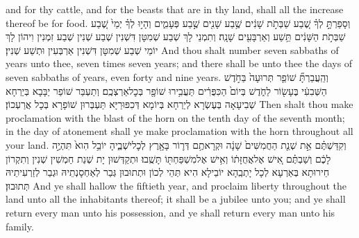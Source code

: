 {and for thy cattle, and for the beasts that are in thy land, shall all the increase thereof be for food.}{}
{וְסָפַרְתָּ֣ לְךָ֗ שֶׁ֚בַע שַׁבְּתֹ֣ת שָׁנִ֔ים שֶׁ֥בַע שָׁנִ֖ים שֶׁ֣בַע פְּעָמִ֑ים וְהָי֣וּ לְךָ֗ יְמֵי֙ שֶׁ֚בַע שַׁבְּתֹ֣ת הַשָּׁנִ֔ים תֵּ֥שַׁע וְאַרְבָּעִ֖ים שָׁנָֽה׃}
{וְתִמְנֵי לָךְ שְׁבַע שְׁמִטָּן דִּשְׁנִין שְׁבַע שְׁנִין שְׁבַע זִמְנִין וִיהוֹן לָךְ יוֹמֵי שְׁבַע שְׁמִטָּן דִּשְׁנִין אַרְבְּעִין וּתְשַׁע שְׁנִין׃}
{And thou shalt number seven sabbaths of years unto thee, seven times seven years; and there shall be unto thee the days of seven sabbaths of years, even forty and nine years.}{}
{וְהַֽעֲבַרְתָּ֞ שׁוֹפַ֤ר תְּרוּעָה֙ בַּחֹ֣דֶשׁ הַשְּׁבִעִ֔י בֶּעָשׂ֖וֹר לַחֹ֑דֶשׁ בְּיוֹם֙ הַכִּפֻּרִ֔ים תַּעֲבִ֥ירוּ שׁוֹפָ֖ר בְּכׇל\maqqaf אַרְצְכֶֽם׃}
{וְתַעְבַּר שׁוֹפַר יַבָּבָא בְּיַרְחָא שְׁבִיעָאָה בְּעֶשְׂרָא לְיַרְחָא בְּיוֹמָא דְּכִפּוּרַיָּא תַּעְבְּרוּן שׁוֹפָרָא בְּכָל אֲרַעְכוֹן׃}
{Then shalt thou make proclamation with the blast of the horn on the tenth day of the seventh month; in the day of atonement shall ye make proclamation with the horn throughout all your land.}{}
{וְקִדַּשְׁתֶּ֗ם אֵ֣ת שְׁנַ֤ת הַחֲמִשִּׁים֙ שָׁנָ֔ה וּקְרָאתֶ֥ם דְּר֛וֹר בָּאָ֖רֶץ לְכׇל\maqqaf יֹשְׁבֶ֑יהָ יוֹבֵ֥ל הִוא֙ תִּהְיֶ֣ה לָכֶ֔ם וְשַׁבְתֶּ֗ם אִ֚ישׁ אֶל\maqqaf אֲחֻזָּת֔וֹ וְאִ֥ישׁ אֶל\maqqaf מִשְׁפַּחְתּ֖וֹ תָּשֻֽׁבוּ׃}
{וּתְקַדְּשׁוּן יָת שְׁנַת חַמְשִׁין שְׁנִין וְתִקְרוֹן חֵירוּתָא בְּאַרְעָא לְכָל יָתְבַֽהָא יוֹבֵילָא הִיא תְּהֵי לְכוֹן וּתְתוּבוּן גְּבַר לְאַחְסָנְתֵיהּ וּגְבַר לְזַרְעִיתֵיהּ תְּתוּבוּן׃}
{And ye shall hallow the fiftieth year, and proclaim liberty throughout the land unto all the inhabitants thereof; it shall be a jubilee unto you; and ye shall return every man unto his possession, and ye shall return every man unto his family.}{}
